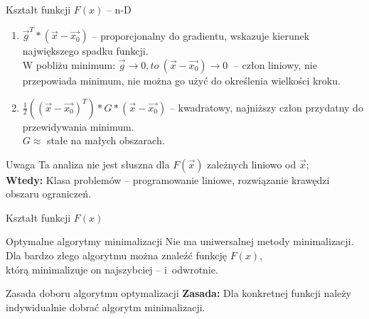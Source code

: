   \begin{frame}{Kształt funkcji $ F(x) $ -- n-D}
    \begin{enumerate}
      \item $ \vec{g}^T * (\vec{x} - \vec{x_0}) $ -- proporcjonalny do
      gradientu, wskazuje kierunek największego spadku funkcji.\\
      W pobliżu minimum: $ \vec{g} \to 0{, to}\ (\vec{x} - \vec{x_0}) \to 0
      \;$ -- człon liniowy, nie przepowiada minimum,
      nie można go użyć do określenia wielkości kroku.

      \item $ \frac{1}{2}((\vec{x} - \vec{x_0})^T) * G * (\vec{x} - \vec{x_0}) $
      -- kwadratowy, najniższy człon przydatny do przewidywania minimum.\\
      $ G \approx $ stałe na małych obszarach.
    \end{enumerate}

    \begin{alertblock}{Uwaga}
      Ta analiza nie jest słuszna dla $ F(\vec{x}) $ zależnych liniowo
      od $ \vec{x} $;\\
      \textbf{Wtedy:} Klasa problemów -- programowanie liniowe, rozwiązanie krawędzi obszaru ograniczeń.
    \end{alertblock}
  \end{frame}

  \begin{frame}{Kształt funkcji $ F(x) $}
    \begin{block}{Optymalne algorytmy minimalizacji}
      Nie ma uniwersalnej metody minimalizacji. \\
      Dla bardzo złego algorytmu można znaleźć funkcję $ F(x) $,\\
      którą minimalizuje on najszybciej -- i~odwrotnie.
    \end{block}
    \begin{block}{Zasada doboru algorytmu optymalizacji}
      \textbf{Zasada:} Dla konkretnej funkcji należy indywidualnie dobrać algorytm minimalizacji.
    \end{block}

  \end{frame}
